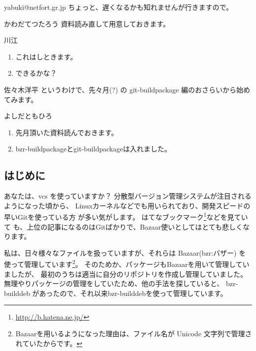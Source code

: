 \documentclass[mingoth,a4paper]{jsarticle}
\begin{document}
\begin{prework}{ yabuki@netfort.gr.jp }
ちょっと、遅くなるかも知れませんが行きますので。
\end{prework}

\begin{prework}{ かわだてつたろう }
資料読み直して用意しておきます。
\end{prework}

\begin{prework}{ 川江 }
\begin{enumerate}
\item これはしときます。
\item できるかな？
\end{enumerate}
\end{prework}

\begin{prework}{ 佐々木洋平 }
というわけで、先々月(?) の git-buildpackage 編のおさらいから始めてみます。
\end{prework}

\begin{prework}{ よしだともひろ }
\begin{enumerate}
\item 先月頂いた資料読んでおきます。
\item bzr-buildpackageとgit-buildpackageは入れました。
\end{enumerate}
\end{prework}



\clearpage

\subsection{はじめに}

あなたは、vcs を使っていますか？
分散型バージョン管理システムが注目されるようになった頃から、
Linuxカーネルなどでも用いられており、開発スピードの早いGitを使っている方
が多い気がします。
はてなブックマーク\footnote{\url{http://b.hatena.ne.jp/}}などを見ていて
も、上位の記事になるのはGitばかりで、Bazaar使いとしてはとても悲しくなります。

私は、日々様々なファイルを扱っていますが、それらは Bazaar(bzr:バザー) を
使って管理しています\footnote{Bazaarを用いるようになった理由は、ファイル名が
Unicode 文字列で管理されていたからです。}。
そのためか、パッケージもBazaarを用いて管理していましたが、
最初のうちは適当に自分のリポジトリを作成し管理していました。
無理やりパッケージの管理をしていたため、他の手法を探していると、
bzr-builddeb があったので、それ以来bzr-builddebを使って管理しています。
\end{document}
